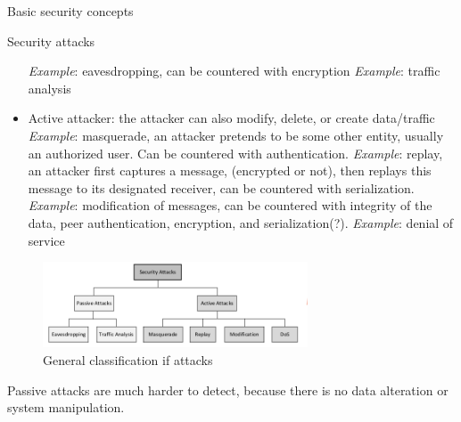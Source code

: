 \begin{section}{Basic security concepts}
\begin{subsection}{Security attacks}
\begin{itemize}
        \subitem \textit{Example}: eavesdropping, can be countered with encryption
        \subitem \textit{Example}: traffic analysis
      \item Active attacker: the attacker can also modify, delete, or create data/traffic
        \subitem \textit{Example}: masquerade, an attacker pretends to be some other entity, usually 
        an authorized user. Can be countered with authentication.
        \subitem \textit{Example}: replay, an attacker first captures a message, (encrypted or not),
        then replays this message to its designated receiver, can be countered with serialization.
        \subitem \textit{Example}: modification of messages, can be countered with integrity of the 
        data, peer authentication, encryption, and serialization(?).
        \subitem \textit{Example}: denial of service
    \end{itemize}
    \begin{figure}[h]
      \centering
      \includegraphics[width=0.7\textwidth]{img/wireless/attacks classification.png}
      \caption{General classification if attacks}
    \end{figure}

    Passive attacks are much harder to detect, because there is no data alteration or system
    manipulation.


\end{subsection}
\end{section}
